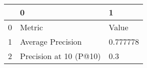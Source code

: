 \begin{tabular}{lll}
\toprule
{} &                       0 &         1 \\
\midrule
0 &                  Metric &     Value \\
1 &       Average Precision &  0.777778 \\
2 &  Precision at 10 (P@10) &       0.3 \\
\bottomrule
\end{tabular}
